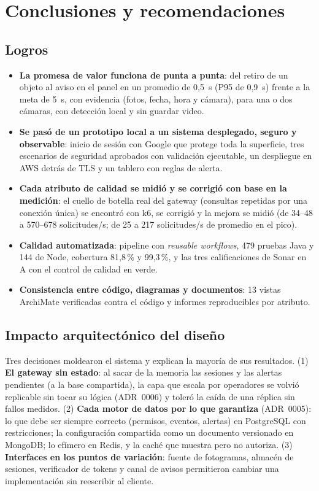 \chapter{Conclusiones y recomendaciones}

\section{Logros}
\begin{itemize}
  \item \textbf{La promesa de valor funciona de punta a punta}: del retiro de un objeto al aviso en el panel en un promedio de 0,5~s (P95 de
  0,9~s) frente a la meta de 5~s, con evidencia (fotos, fecha, hora y cámara), para una o dos cámaras, con detección local y sin guardar video.
  \item \textbf{Se pasó de un prototipo local a un sistema desplegado, seguro y observable}: inicio de sesión con Google que protege toda la
  superficie, tres escenarios de seguridad aprobados con validación ejecutable, un despliegue en AWS detrás de TLS y un tablero con reglas de alerta.
  \item \textbf{Cada atributo de calidad se midió y se corrigió con base en la medición}: el cuello de botella real del gateway (consultas
  repetidas por una conexión única) se encontró con k6, se corrigió y la mejora se midió (de 34--48 a 570--678 solicitudes/s; de 25 a 217
  solicitudes/s de promedio en el pico).
  \item \textbf{Calidad automatizada}: pipeline con \emph{reusable workflows}, 479 pruebas Java y 144 de Node, cobertura 81,8\,\% y 99,3\,\%,
  y las tres calificaciones de Sonar en A con el control de calidad en verde.
  \item \textbf{Consistencia entre código, diagramas y documentos}: 13 vistas ArchiMate verificadas contra el código y informes reproducibles
  por atributo.
\end{itemize}

\section{Impacto arquitectónico del diseño}
Tres decisiones moldearon el sistema y explican la mayoría de sus resultados. (1) \textbf{El gateway sin estado}: al sacar de la memoria las
sesiones y las alertas pendientes (a la base compartida), la capa que escala por operadores se volvió replicable sin tocar su lógica
(ADR~0006) y toleró la caída de una réplica sin fallos medidos. (2) \textbf{Cada motor de datos por lo que garantiza} (ADR~0005): lo que debe
ser siempre correcto (permisos, eventos, alertas) en PostgreSQL con restricciones; la configuración compartida como un documento versionado
en MongoDB; lo efímero en Redis, y la caché que muestra pero no autoriza. (3) \textbf{Interfaces en los puntos de variación}: fuente de
fotogramas, almacén de sesiones, verificador de tokens y canal de avisos permitieron cambiar una implementación sin reescribir al cliente.

